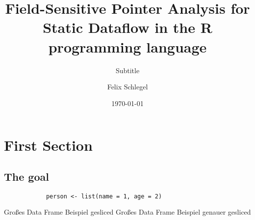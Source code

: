 \documentclass[
    aspectratio=169, %
    8pt %
]{beamer}
\title[Short Title]{Field-Sensitive Pointer Analysis for Static Dataflow in the R programming language}
\subtitle[Short Subtitle]{Subtitle}
\author[Short Author]{Felix Schlegel}
\date{\today}
\begin{document}

\section{First Section}

\subsection{The goal}
\begin{frame}[fragile]{\insertsubsection}
    \begin{fancycolumns}[columns=2]
        \begin{verbatim}
            person <- list(name = 1, age = 2)
        \end{verbatim}
        Großes Data Frame Beispiel gesliced
    \nextcolumn
        Großes Data Frame Beispiel genauer gesliced
    \end{fancycolumns}
\end{frame}
\end{document}
